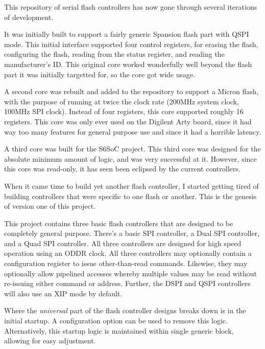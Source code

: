 \documentclass{gqtekspec}
\begin{document}
This repository of serial flash controllers has now gone through several
iterations of development.

It was initially built to support a fairly generic Spansion flash part
with QSPI mode.  This initial interface supported four control registers,
for erasing the flash, configuring the flash, reading from the status register,
and reading the manufacturer's ID.  This original core worked wonderfully
well beyond the flash part it was initially targetted for, so the core got
wide usage.

A second core was rebuilt and added to the repository to support a Micron
flash, with the purpose of running at twice the clock rate (200MHz system
clock, 100MHz SPI clock).  Instead of four registers, this core supported
roughly 16 registers.  This core was only ever used on the Digilent
Arty board, since it had way too many features for general purpose use
and since it had a horrible latency.

A third core was built for the S6SoC project.  This third core was designed
for the absolute minimum amount of logic, and was very successful at it.
However, since this core was read-only, it has seen been eclipsed by the
current controllers.

When it came time to build yet another flash controller, I started getting
tired of building controllers that were specific to one flash or another.
This is the genesis of version one of  this project.

This project contains three basic flash controllers that are designed to be
completely general purpose.  There's a basic SPI controller, a Dual SPI
controller, and a Quad SPI controller.  All three controllers are designed
for high speed operation using an ODDR clock.  All three controllers may
optionally contain a configuration register to issue other-than-read commands.
Likewise, they may optionally allow pipelined accesses whereby multiple values
may be read without re-issuing either command or address.  Further, the
DSPI and QSPI controllers will also use an XIP mode by default.

Where the {\em universal} part of the flash controller designs breaks down
is in the initial startup.  A configuration option can be used to remove this
logic.  Alternatively, this startup logic is maintained within single
generic block, allowing for easy adjustment.

\end{document}
